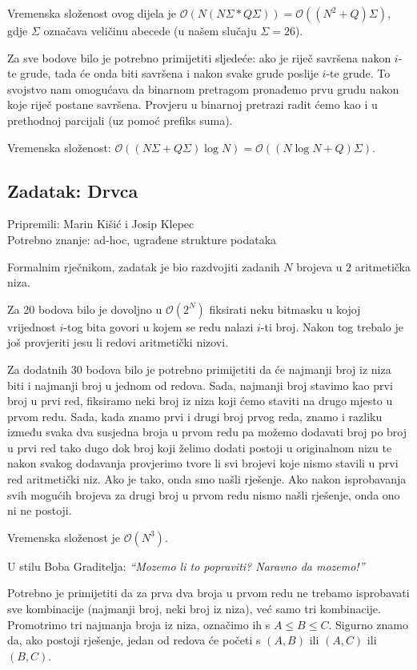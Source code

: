 \documentclass[a4paper]{article}
\begin{document}
Vremenska složenost ovog dijela je $\mathcal{O}(N(N\Sigma * Q\Sigma))=
\mathcal{O}((N^2 + Q)\Sigma)$, gdje $\Sigma$ označava veličinu abecede
(u našem slučaju $\Sigma=26$).

Za sve bodove bilo je potrebno primijetiti sljedeće: ako je riječ savršena nakon
$i$-te grude, tada će onda biti savršena i nakon svake grude poslije $i$-te
grude. To svojstvo nam omogućava da binarnom pretragom pronađemo prvu grudu
nakon koje riječ postane savršena. Provjeru u binarnoj pretrazi radit ćemo kao
i u prethodnoj parcijali (uz pomoć prefiks suma).

Vremenska složenost: $\mathcal{O}((N\Sigma + Q\Sigma)\log N) = \mathcal{O}((N \log N + Q)\Sigma)$.

\subsection*{Zadatak: Drvca}
\textsf{Pripremili: Marin Kišić i Josip Klepec}\\
\textsf{Potrebno znanje: ad-hoc, ugrađene strukture podataka}

Formalnim rječnikom, zadatak je bio razdvojiti zadanih $N$ brojeva u $2$
aritmetička niza.

Za 20 bodova bilo je dovoljno u $\mathcal{O}(2^N)$ fiksirati neku bitmasku u
kojoj vrijednost $i$-tog bita govori u kojem se redu nalazi $i$-ti broj. Nakon
tog trebalo je još provjeriti jesu li redovi aritmetički nizovi.

Za dodatnih $30$ bodova bilo je potrebno primijetiti da će najmanji broj iz
niza biti i najmanji broj u jednom od redova. Sada, najmanji broj stavimo kao
prvi broj u prvi red, fiksiramo neki broj iz niza koji ćemo staviti na drugo
mjesto u prvom redu. Sada, kada znamo prvi i drugi broj prvog reda, znamo i
razliku između svaka dva susjedna broja u prvom redu pa možemo dodavati broj po
broj u prvi red tako dugo dok broj koji želimo dodati postoji u originalnom
nizu te  nakon svakog dodavanja provjerimo tvore li svi brojevi koje nismo
stavili u prvi red aritmetički niz.  Ako je tako, onda smo našli rješenje. Ako
nakon isprobavanja svih mogućih brojeva za drugi broj u prvom redu nismo našli
rješenje, onda ono ni ne postoji.

Vremenska složenost je $\mathcal{O}(N^3)$.

U stilu Boba Graditelja: \emph{“Mozemo li to popraviti? Naravno da mozemo!”}

Potrebno je primijetiti da za prva dva broja u prvom redu ne trebamo isprobavati
sve kombinacije (najmanji broj, neki broj iz niza), već samo tri kombinacije.
Promotrimo tri najmanja broja iz niza, označimo ih s $A \le B \le C$. Sigurno
znamo da, ako postoji rješenje, jedan od redova će početi s $(A, B)$ ili $(A, C)$
ili $(B, C)$.
\end{document}
